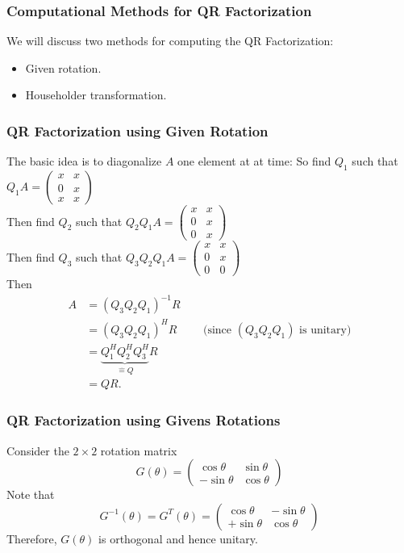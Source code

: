\documentclass{beamer}
\begin{document}
\begin{frame}\frametitle{Computational Methods for QR Factorization}

	We will discuss two methods for computing the QR Factorization:

	\begin{itemize}
		\item Given rotation.		
		\item Householder transformation.
	\end{itemize}

\end{frame}

\begin{frame}\frametitle{QR Factorization using Given Rotation}
	The basic idea is to diagonalize $A$ one element at at time:
	So find $Q_1$ such that 
		$Q_1A = \begin{pmatrix}x&x\\0&x\\x&x\end{pmatrix}$
		\\
	Then find $Q_2$ such that 
		$Q_2Q_1A = \begin{pmatrix}x&x\\0&x\\0&x\end{pmatrix}$
		\\
	Then find $Q_3$ such that 
		$Q_3Q_2Q_1A = \begin{pmatrix}x&x\\0&x\\0&0\end{pmatrix}$
		\\
	Then 
	\begin{align*}
	A &= (Q_3Q_2Q_1)^{-1}R\\
	&= (Q_3Q_2Q_1)^HR \qquad \text{ (since $(Q_3Q_2Q_1)$ is unitary)}\\
	&= \underbrace{Q_1^HQ_2^HQ_3^H}_{\hat{=}Q}R\\
	&= QR.
	\end{align*}
\end{frame}

\begin{frame}\frametitle{QR Factorization using Givens Rotations}
	Consider the $2\times 2$ rotation matrix
	\[ 
		G(\theta) 
			= \begin{pmatrix} 
	    		\cos\theta & \sin\theta \\
	  			-\sin\theta & \cos\theta
	  		  \end{pmatrix}
	\]
	Note that 
	\[
		G^{-1}(\theta) 
			= G^T(\theta) 
			= \begin{pmatrix}
	    		\cos\theta & -\sin\theta\\
	  			+\sin\theta & \cos\theta
	  		  \end{pmatrix}
	\]
	Therefore, $G(\theta)$ is orthogonal and hence unitary.	
\end{frame}
\end{document}
